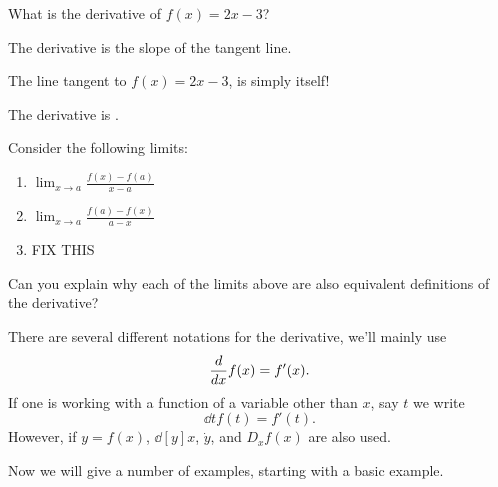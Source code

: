 \documentclass{ximera}
\begin{document}


\begin{question}
What is the derivative of $f(x) = 2x-3$?
\begin{hint}
The derivative is the slope of the tangent line.
\end{hint}
\begin{hint}
The line tangent to $f(x) = 2x-3$, is simply itself!
\end{hint}
\begin{prompt}
The derivative is .
\end{prompt}
\end{question}


\begin{question} 


Consider the following limits:
\begin{enumerate}
\item $\lim_{x\to a} \frac{f(x)-f(a)}{x-a}$\\
\item $\lim_{x\to a} \frac{f(a)-f(x)}{a-x}$\\
\item FIX THIS
\end{enumerate}
Can you explain why each of the limits above are also equivalent
definitions of the derivative?
\end{question}

\begin{definition}
There are several different notations for the derivative, we'll mainly
use
\[
\frac{d}{dx} f(x) = f'(x).
\]
If one is working with a function of a variable other than $x$, say $t$ we write
\[
\dd{t} f(t) = f'(t).
\]
However, if $y = f(x)$, $\dd[y]{x}$, $\dot{y}$, and $D_x f(x)$ are
also used.
\end{definition}

Now we will give a number of examples, starting with a basic example.
\end{document}
